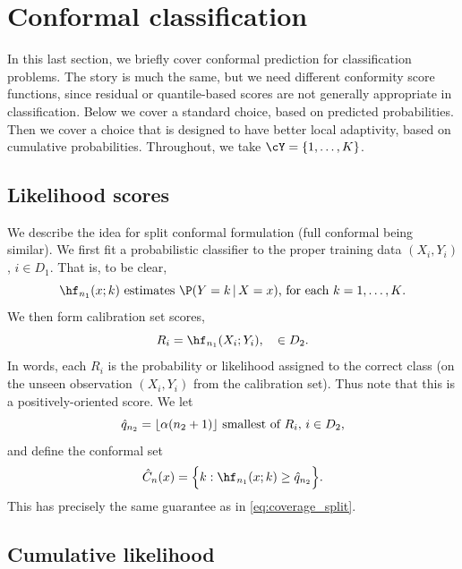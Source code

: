 \documentclass{article}
\begin{document}
\section{Conformal classification}

In this last section, we briefly cover conformal prediction for classification
problems. The story is much the same, but we need different conformity score
functions, since residual or quantile-based scores are not generally
appropriate in classification. Below we cover a standard choice, based on
predicted probabilities. Then we cover a choice that is designed to have better
local adaptivity, based on cumulative probabilities. Throughout, we take $\cY = 
\{1,\dots,K\}$.      

\subsection{Likelihood scores}

We describe the idea for split conformal formulation (full conformal being
similar). We first fit a probabilistic classifier  to the
proper training  data $(X_i,Y_i)$, $i \in D_1$. That is, to be clear, 
\[
\text{$\hf_{n_1}(x; k)$ estimates $\P(Y=k \,|\, X=x)$, for each
  $k=1,\ldots,K$}. 
\]
We then form calibration set scores,
\[
R_i = \hf_{n_1}(X_i; Y_i), \quad \in D_2.
\]
In words, each $R_i$ is the probability or likelihood assigned to the correct
class (on the unseen observation $(X_i,Y_i)$ from the calibration set). Thus
note that this is a positively-oriented score. We let
\[
\text{$\hat{q}_{n_2} = \lfloor \alpha (n_2+1) \rfloor$ smallest of $R_i$, $i \in
  D_2$},  
\]
and define the conformal set
\[
\hC_n(x) = \Big\{ k : \hf_{n_1}(x; k) \geq \hq_{n_2} \Big\}.
\]
This has precisely the same guarantee as in \eqref{eq:coverage_split}.

\subsection{Cumulative likelihood}
\end{document}
